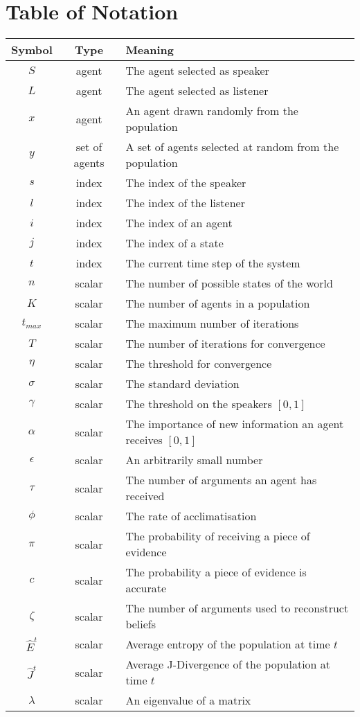 \section*{Table of Notation}
\begin{table}[H]
\begin{tabular}{|c|c|l|} \hline
Symbol & Type &  Meaning \\ \hline \hline
$S$ & agent & The agent selected as speaker \\
$L$ & agent & The agent selected as listener\\ 
$x$ & agent & An agent drawn randomly from the population \\
$y$ & set of agents & A set of agents selected at random from the population \\ \hline \hline

$s$ & index & The index of the speaker   \\
$l$ & index & The index of the listener\\
$i$ & index & The index of an agent\\
$j$ & index & The index of a state\\
$t$ & index & The current time step of the system\\  \hline \hline

$n$ & scalar & The number of possible states of the world \\
$K$ & scalar & The number of agents in a population \\
$t_{max}$ & scalar & The maximum number of iterations \\
$T$ & scalar & The number of iterations for convergence \\
$\eta$ & scalar & The threshold for convergence\\
$\sigma$ & scalar & The standard deviation \\
$\gamma$ & scalar & The threshold on the speakers $[0,1]$\\
$\alpha$ & scalar & The importance of new information an agent receives $[0,1]$ \\
$\epsilon$ & scalar & An arbitrarily small number \\
$\tau$ & scalar & The number of arguments an agent has received \\
$\phi$ & scalar & The rate of acclimatisation \\
$\pi$ & scalar & The probability of receiving a piece of evidence\\
$c$ & scalar & The probability a piece of evidence is accurate \\
$\zeta$ & scalar & The number of arguments used to reconstruct beliefs\\
$\hat{E}^t$ & scalar & Average entropy of the population at time $t$ \\
$\hat{J}^t$ & scalar & Average J-Divergence of the population at time $t$ \\
$\lambda$ & scalar & An eigenvalue of a matrix \\ \hline \hline



\end{tabular}
\end{table}

